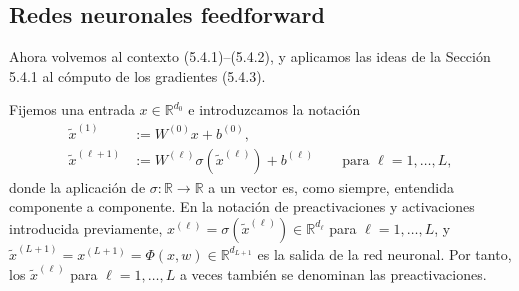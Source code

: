 \documentclass[11pt]{report}
\theoremstyle{definition}
\theoremstyle{plain}
\numberwithin{equation}{section}
\begin{document}
\subsection{Redes neuronales feedforward}

Ahora volvemos al contexto (5.4.1)--(5.4.2), y aplicamos las ideas de la Sección 5.4.1 al cómputo de los gradientes (5.4.3).

Fijemos una entrada \(x\in\mathbb{R}^{d_0}\) e introduzcamos la notación
\begin{align*}
    \widetilde{x}^{(1)}
    &:=
    W^{(0)}x+b^{(0)},
    \tag{5.4.6a}\\
    \widetilde{x}^{(\ell+1)}
    &:=
    W^{(\ell)}\sigma(\widetilde{x}^{(\ell)})+b^{(\ell)}
    \qquad
    \text{para } \ell=1,\ldots,L,
    \tag{5.4.6b}
\end{align*}
donde la aplicación de \(\sigma:\mathbb{R}\to\mathbb{R}\) a un vector es, como siempre, entendida componente a componente. En la notación de preactivaciones y activaciones introducida previamente, \(x^{(\ell)}=\sigma(\widetilde{x}^{(\ell)})\in\mathbb{R}^{d_\ell}\) para \(\ell=1,\ldots,L\), y \(\widetilde{x}^{(L+1)}=x^{(L+1)}=\Phi(x,w)\in\mathbb{R}^{d_{L+1}}\) es la salida de la red neuronal. Por tanto, los \(\widetilde{x}^{(\ell)}\) para \(\ell=1,\ldots,L\) a veces también se denominan las preactivaciones.
\end{document}
